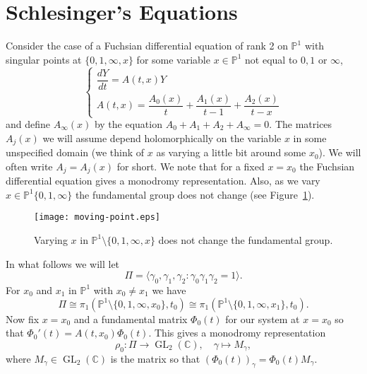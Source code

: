 \documentclass[12pt]{book}
\numberwithin{equation}{section}
\theoremstyle{definition}
\theoremstyle{remark}
\newcommand{\CC}{\mathbb{C}}
\newcommand{\PP}{\mathbb{P}}
\newcommand{\GL}{\operatorname{GL}}
\begin{document}
\section{Schlesinger's Equations}\label{S:schlesinger}
Consider the case of a Fuchsian differential equation of rank 2 on $\PP^1$ with singular points at $\lbrace 0,1,\infty,x\rbrace$ for some variable $x\in \PP^1$ not equal to $0,1$ or $\infty$,
$$\begin{cases}
	  \dfrac{dY}{dt} = A(t,x) Y \\
	  A(t,x) = \dfrac{A_0(x)}{t} +\dfrac{A_1(x)}{t-1} + \dfrac{A_2(x)}{t-x} 
\end{cases}$$
and define $A_{\infty}(x)$ by the equation $A_0+A_1+A_2 +A_{\infty}=0$.
The matrices $A_j(x)$ we will assume depend holomorphically on the variable $x$ in some unspecified domain (we think of $x$ as varying a little bit around some $x_0$).
We will often write $A_j=A_j(x)$ for short.
We note that for a fixed $x=x_0$ the Fuchsian differential equation gives a monodromy representation. 
Also, as we vary $x\in \PP^1\lbrace 0,1,\infty\rbrace$ the fundamental group does not change (see Figure~\ref{F:moving-point}).
\begin{figure}[h]\label{F:moving-point}
	\begin{center}
		\texttt{[image: moving-point.eps]}
	\end{center}
\caption{Varying $x$ in $\PP^1\setminus\lbrace 0,1,\infty,x\rbrace$ does not change the fundamental group.}
\end{figure}
In what follows we will let 
 $$ \Pi=\langle \gamma_0,\gamma_1,\gamma_2 \colon \gamma_0\gamma_1\gamma_2=1\rangle.$$
For $x_0$ and $x_1$ in $\PP^1$ with $x_0\neq x_1$ we have 
 $$\Pi\cong \pi_1( \PP^1\setminus\lbrace 0,1,\infty,x_0\rbrace,t_0) \cong \pi_1(\PP^1\setminus\lbrace 0,1,\infty,x_1\rbrace,t_0).$$
Now fix $x=x_0$ and a fundamental matrix $\Phi_0(t)$ for our system at $x=x_0$ so that $\Phi_0'(t) = A(t,x_0)\Phi_0(t)$. 
This gives a monodromy representation 
$$ \rho_0\colon \Pi \to \GL_2(\CC), \quad \gamma \mapsto M_{\gamma},$$
where $M_{\gamma} \in \GL_2(\CC)$ is the matrix so that $(\Phi_0(t))_{\gamma} = \Phi_0(t) M_{\gamma}$.
\end{document}
